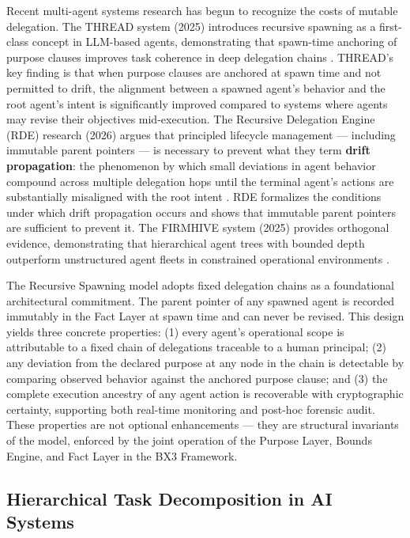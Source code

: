 Recent multi-agent systems research has begun to recognize the costs of mutable delegation. The THREAD system (2025) introduces recursive spawning as a first-class concept in LLM-based agents, demonstrating that spawn-time anchoring of purpose clauses improves task coherence in deep delegation chains \cite{thread2025}. THREAD's key finding is that when purpose clauses are anchored at spawn time and not permitted to drift, the alignment between a spawned agent's behavior and the root agent's intent is significantly improved compared to systems where agents may revise their objectives mid-execution. The Recursive Delegation Engine (RDE) research (2026) argues that principled lifecycle management — including immutable parent pointers — is necessary to prevent what they term \textbf{drift propagation}: the phenomenon by which small deviations in agent behavior compound across multiple delegation hops until the terminal agent's actions are substantially misaligned with the root intent \cite{rde2026}. RDE formalizes the conditions under which drift propagation occurs and shows that immutable parent pointers are sufficient to prevent it. The FIRMHIVE system (2025) provides orthogonal evidence, demonstrating that hierarchical agent trees with bounded depth outperform unstructured agent fleets in constrained operational environments \cite{firmhive2025}.

The Recursive Spawning model adopts fixed delegation chains as a foundational architectural commitment. The parent pointer of any spawned agent is recorded immutably in the Fact Layer at spawn time and can never be revised. This design yields three concrete properties: (1) every agent's operational scope is attributable to a fixed chain of delegations traceable to a human principal; (2) any deviation from the declared purpose at any node in the chain is detectable by comparing observed behavior against the anchored purpose clause; and (3) the complete execution ancestry of any agent action is recoverable with cryptographic certainty, supporting both real-time monitoring and post-hoc forensic audit. These properties are not optional enhancements — they are structural invariants of the model, enforced by the joint operation of the Purpose Layer, Bounds Engine, and Fact Layer in the BX3 Framework.

\subsection{Hierarchical Task Decomposition in AI Systems}
\label{sec:htd}

